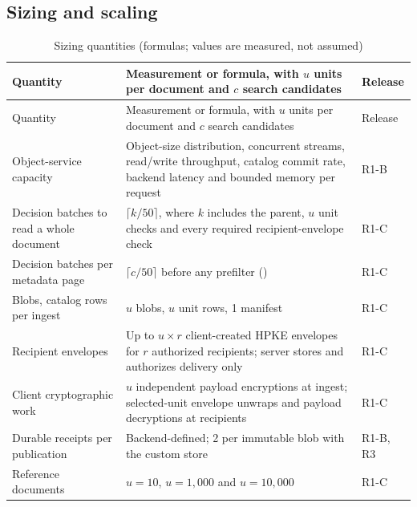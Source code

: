\subsection{Sizing and scaling}
\begin{longtable}{@{}P{0.28\textwidth}P{0.44\textwidth}P{0.18\textwidth}@{}}
\caption{Sizing quantities (formulas; values are measured, not assumed)}\label{tab:sizing}\\
\toprule Quantity & Measurement or formula, with $u$ units per document and $c$ search candidates & Release\\\midrule\endfirsthead
\toprule Quantity & Measurement or formula, with $u$ units per document and $c$ search candidates & Release\\\midrule\endhead
Object-service capacity & Object-size distribution, concurrent streams, read/write throughput, catalog commit rate, backend latency and bounded memory per request & R1-B\\
Decision batches to read a whole document & $\lceil k/50 \rceil$, where $k$ includes the parent, $u$ unit checks and every required recipient-envelope check & R1-C\\
Decision batches per metadata page & $\lceil c/50 \rceil$ before any prefilter () & R1-C\\
Blobs, catalog rows per ingest & $u$ blobs, $u$ unit rows, 1 manifest & R1-C\\
Recipient envelopes & Up to $u \times r$ client-created HPKE envelopes for $r$ authorized recipients; server stores and authorizes delivery only & R1-C\\
Client cryptographic work & $u$ independent payload encryptions at ingest; selected-unit envelope unwraps and payload decryptions at recipients & R1-C\\
Durable receipts per publication & Backend-defined; 2 per immutable blob with the custom store & R1-B, R3\\
Reference documents & $u = 10$, $u = 1{,}000$ and $u = 10{,}000$ & R1-C\\
\bottomrule
\end{longtable}
